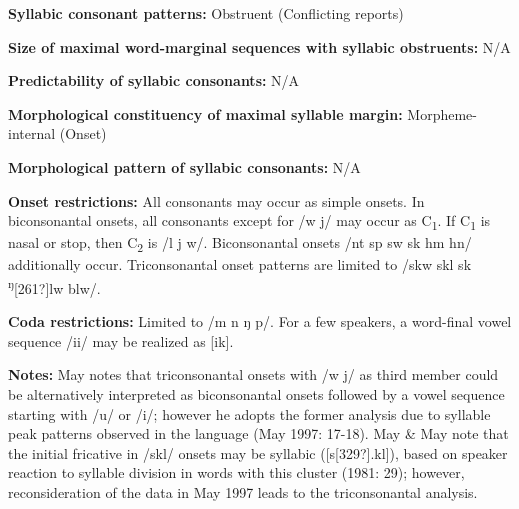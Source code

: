 \begin{styleBody}
\textbf{Syllabic consonant patterns:} Obstruent (Conflicting reports)
\end{styleBody}

\begin{styleBody}
\textbf{Size of maximal word{}-marginal sequences with syllabic obstruents:} N/A
\end{styleBody}

\begin{styleBody}
\textbf{Predictability of syllabic consonants:} N/A
\end{styleBody}

\begin{styleBody}
\textbf{Morphological constituency of maximal syllable margin:} Morpheme-internal (Onset)
\end{styleBody}

\begin{styleBody}
\textbf{Morphological pattern of syllabic consonants:} N/A
\end{styleBody}

\begin{styleBody}
\textbf{Onset restrictions: }All consonants may occur as simple onsets. In biconsonantal onsets, all consonants except for /w j/ may occur as C\textsubscript{1}. If C\textsubscript{1} is nasal or stop, then C\textsubscript{2} is /l j w/. Biconsonantal onsets /nt sp sw sk hm hn/ additionally occur. Triconsonantal onset patterns are limited to /skw skl sk \textsuperscript{ŋ}[261?]lw blw/.
\end{styleBody}

\begin{styleBody}
\textbf{Coda restrictions:} Limited to /m n ŋ p/. For a few speakers, a word-final vowel sequence /ii/ may be realized as [ik].
\end{styleBody}

\begin{styleBody}
\textbf{Notes: }May notes that triconsonantal onsets with /w j/ as third member could be alternatively interpreted as biconsonantal onsets followed by a vowel sequence starting with /u/ or /i/; however he adopts the former analysis due to syllable peak patterns observed in the language (May 1997: 17-18). May \& May note that the initial fricative in /skl/ onsets may be syllabic ([s[329?].kl]), based on speaker reaction to syllable division in words with this cluster (1981: 29); however, reconsideration of the data in May 1997 leads to the triconsonantal analysis.
\end{styleBody}

